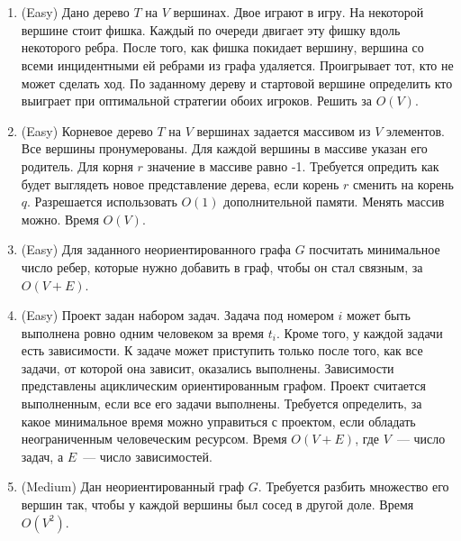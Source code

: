 \section{}

\begin{enumerate}

  \item (Easy) Дано дерево $T$ на $V$ вершинах. Двое играют в игру. На некоторой
  вершине стоит фишка. Каждый по очереди двигает эту фишку вдоль
  некоторого ребра. После того, как фишка покидает вершину, 
  вершина со всеми инцидентными ей ребрами из графа удаляется.
  Проигрывает тот, кто не может сделать ход. По заданному дереву
  и стартовой вершине определить кто выиграет при оптимальной 
  стратегии обоих игроков. Решить за $O(V)$.

  \item (Easy) Корневое дерево $T$ на $V$ вершинах задается массивом 
  из $V$ элементов. Все вершины пронумерованы. Для каждой вершины 
  в массиве указан его родитель.  Для корня $r$ значение в массиве
  равно -1. Требуется опредить как будет выглядеть новое представление 
  дерева, если корень $r$ сменить на корень $q$. Разрешается использовать
  $O(1)$ дополнительной памяти. Менять массив можно. Время $O(V)$.

  \item (Easy) Для заданного неориентированного графа $G$ посчитать
          минимальное число ребер, которые нужно добавить в граф, чтобы 
          он стал связным, за $O(V + E)$.

  \item (Easy) Проект задан набором задач. Задача под номером $i$ может
    быть выполнена ровно одним человеком за время $t_i$. Кроме того, у 
    каждой задачи есть зависимости. К задаче может приступить только 
    после того, как все задачи, от которой она зависит, оказались выполнены.
    Зависимости представлены ациклическим ориентированным графом. 
    Проект считается выполненным, если все его задачи выполнены.
    Требуется определить, за какое минимальное время можно управиться с проектом,
    если обладать неограниченным человеческим ресурсом. Время $O(V + E)$, где
    $V$~--- число задач, а $E$~--- число зависимостей.

  \item (Medium) Дан неориентированный граф $G$. Требуется разбить множество
      его вершин так, чтобы у каждой вершины был сосед в другой доле. Время
      $O(V^2)$.


\end{enumerate}
